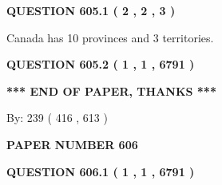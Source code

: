 \documentclass[12pt]{article}
\begin{document}
   
   
   
 \vspace{0.2in}
 
 
 
 
   
   
  
\vspace{0.2in}
  
{\textbf{\Large{QUESTION
605.1 
 ( 2 , 2 , 3 )
}}}
  
  
 
 
\noindent{}
 
 
Canada has 10  provinces and 3 territories.
 
 
 
 
  
\vspace{0.2in}
  
{\textbf{\Large{QUESTION
605.2 
 ( 1 , 1 , 6791 )
}}}
  
  
   
   
 \vspace{0.2in}
 
   
   
   
   
\vspace{1.0in} 
{\textbf{\large{ *** END OF PAPER, THANKS *** }}} 
   
   
\hspace{1.0in} By: 
 239 ( 416 ,  613 )
   
   
   
   
\newpage 
\setcounter{page}{ 
   606001 } 
   
   
   
   
 {\textbf{ \Large{ PAPER NUMBER  606  }}}
   
   
\vspace{0.2in}
   
   
   
   
   
   
 \vspace{0.2in}
 
 
 
 
   
   
  
\vspace{0.2in}
  
{\textbf{\Large{QUESTION
606.1 
 ( 1 , 1 , 6791 )
}}}
  
\end{document}
